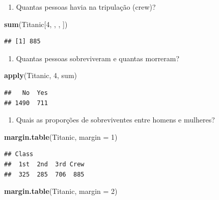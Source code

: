 \documentclass[
]{book}
\newenvironment{Shaded}{\begin{snugshade}}{\end{snugshade}}
\newcommand{\DataTypeTok}[1]{\textcolor[rgb]{0.13,0.29,0.53}{#1}}
\newcommand{\DecValTok}[1]{\textcolor[rgb]{0.00,0.00,0.81}{#1}}
\newcommand{\KeywordTok}[1]{\textcolor[rgb]{0.13,0.29,0.53}{\textbf{#1}}}
\newcommand{\NormalTok}[1]{#1}
\providecommand{\tightlist}{%
  \setlength{\itemsep}{0pt}\setlength{\parskip}{0pt}}
\begin{document}
\begin{enumerate}
\def\labelenumi{\arabic{enumi}.}
\setcounter{enumi}{1}
\tightlist
\item
  Quantas pessoas havia na tripulação (crew)?
\end{enumerate}

\begin{Shaded}
\begin{Highlighting}[]
\KeywordTok{sum}\NormalTok{(Titanic[}\DecValTok{4}\NormalTok{, , , ])}
\end{Highlighting}
\end{Shaded}

\begin{verbatim}
## [1] 885
\end{verbatim}

\begin{enumerate}
\def\labelenumi{\arabic{enumi}.}
\setcounter{enumi}{2}
\tightlist
\item
  Quantas pessoas sobreviveram e quantas morreram?
\end{enumerate}

\begin{Shaded}
\begin{Highlighting}[]
\KeywordTok{apply}\NormalTok{(Titanic, }\DecValTok{4}\NormalTok{, sum)}
\end{Highlighting}
\end{Shaded}

\begin{verbatim}
##   No  Yes 
## 1490  711
\end{verbatim}

\begin{enumerate}
\def\labelenumi{\arabic{enumi}.}
\setcounter{enumi}{3}
\tightlist
\item
  Quais as proporções de sobreviventes entre homens e mulheres?
\end{enumerate}

\begin{Shaded}
\begin{Highlighting}[]
\KeywordTok{margin.table}\NormalTok{(Titanic, }\DataTypeTok{margin =} \DecValTok{1}\NormalTok{)}
\end{Highlighting}
\end{Shaded}

\begin{verbatim}
## Class
##  1st  2nd  3rd Crew 
##  325  285  706  885
\end{verbatim}

\begin{Shaded}
\begin{Highlighting}[]
\KeywordTok{margin.table}\NormalTok{(Titanic, }\DataTypeTok{margin =} \DecValTok{2}\NormalTok{)}
\end{Highlighting}
\end{Shaded}
\end{document}
